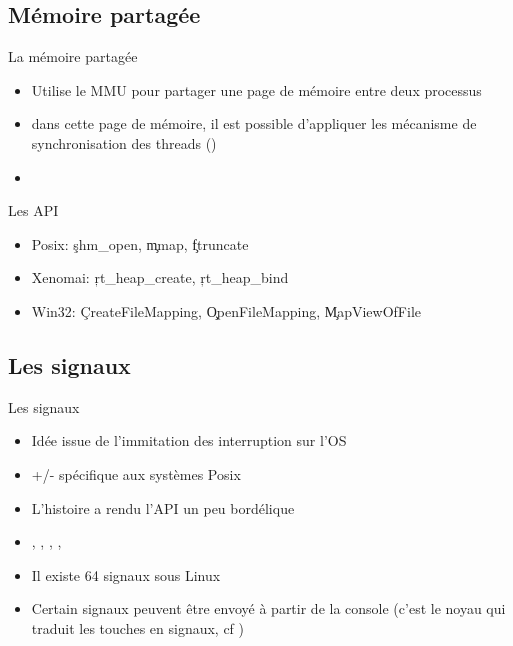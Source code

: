 \subsection{Mémoire partagée}

\begin{frame}[fragile=singleslide]{La mémoire partagée}
  \begin{itemize} 
  \item Utilise  le MMU pour partager  une page de  mémoire entre deux
    processus
  \item dans  cette page de  mémoire, il est possible  d'appliquer les
    mécanisme        de       synchronisation        des       threads
    ()
  \item 
  \end{itemize} 
\end{frame} 

\begin{frame}[fragile=singleslide]{Les API}
  \begin{itemize} 
  \item Posix: \c{shm_open}, \c{mmap}, \c{ftruncate}
  \item Xenomai: \c{rt_heap_create}, \c{rt_heap_bind}
  \item     Win32:     \c{CreateFileMapping},     \c{OpenFileMapping},
    \c{MapViewOfFile}
  \end{itemize} 
\end{frame} 

\subsection{Les signaux}

\begin{frame}[fragile=singleslide]{Les signaux}
  \begin{itemize}
  \item Idée issue de l'immitation des interruption sur l'OS
  \item +/- spécifique aux systèmes Posix
  \item L'histoire a rendu l'API un peu bordélique
  \item     {},     ,    ,
    , 
  \item Il existe 64 signaux sous Linux
  \item Certain  signaux peuvent  être envoyé à  partir de  la console
    (c'est  le   noyau  qui  traduit   les  touches  en   signaux,  cf
    )
  \end{itemize}
\end{frame}

